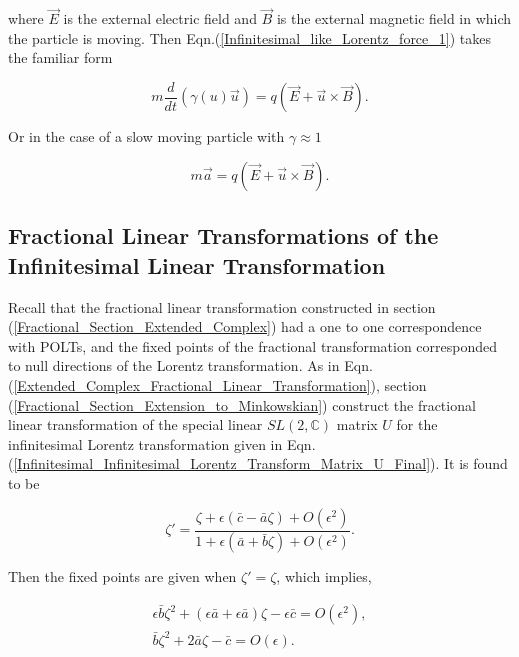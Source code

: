 \noindent where $\vec{E}$ is the external electric field and $\vec{B}$ is the external magnetic field in which the particle is moving. Then Eqn.(\ref{Infinitesimal_like_Lorentz_force_1}) takes the familiar form

\begin{equation*}
m \frac{d}{dt} (\gamma(u) \vec{u}) = q(\vec{E} + \vec{u} \times \vec{B}).
\end{equation*}

\noindent Or in the case of a slow moving particle with  $\gamma \approx 1$ 

\begin{equation*}  
m \vec{a} = q (\vec{E} + \vec{u} \times \vec{B}).
\end{equation*}  

\subsection{Fractional Linear Transformations of the Infinitesimal Linear Transformation}\label{Infinitesimal_Section_Fractional_Linear}

Recall that the fractional linear transformation constructed in section (\ref{Fractional_Section_Extended_Complex}) had a one to one correspondence with POLTs, and the fixed points of the fractional transformation corresponded to null directions of the Lorentz transformation. As in Eqn.(\ref{Extended_Complex_Fractional_Linear_Transformation}), section (\ref{Fractional_Section_Extension_to_Minkowskian}) construct the fractional linear transformation of the special linear $SL(2, \mathbb{C})$ matrix $U$ for the infinitesimal Lorentz transformation given in Eqn.(\ref{Infinitesimal_Infinitesimal_Lorentz_Transform_Matrix_U_Final}). It is found to be

\begin{equation*}   
\zeta' = \frac{\zeta + \epsilon(\bar{c} - \bar{a}\zeta) + O(\epsilon^2)}{1 + \epsilon(\bar{a} + \bar{b} \zeta) + O(\epsilon^2)}.
\end{equation*}

\noindent Then the fixed points are given when $\zeta' = \zeta$, which implies,

\begin{gather}\nonumber
\epsilon \bar{b} \zeta^2 + (\epsilon \bar{a} + \epsilon \bar{a})\zeta - \epsilon \bar{c} = O(\epsilon^2), \\ \label{Infinitesimal_fixed_point_quadratic}
\bar{b} \zeta^2 + 2 \bar{a} \zeta - \bar{c} = O(\epsilon).
\end{gather}

